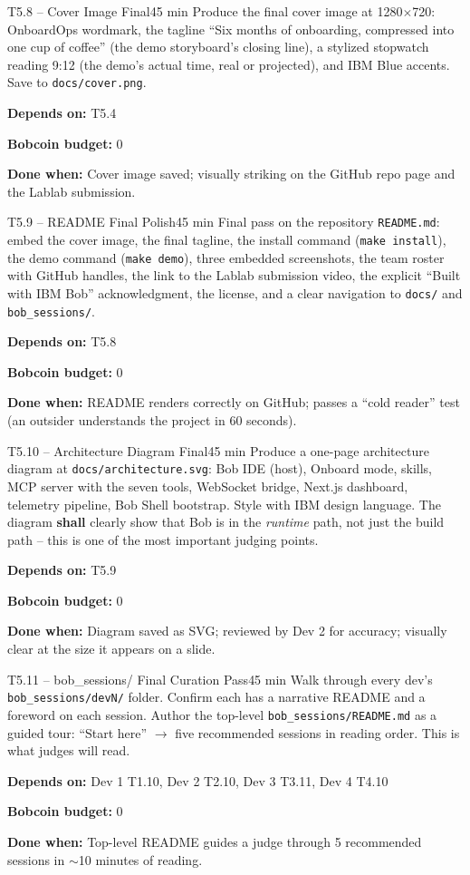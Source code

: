 \documentclass[11pt,letterpaper]{article}
\newcommand{\acceptance}[1]{\par\smallskip\textcolor{ibmgreen}{\textbf{Done when:}} #1}
\newcommand{\depends}[1]{\par\smallskip\textcolor{ibmorange}{\textbf{Depends on:}} #1}
\newcommand{\bobcost}[1]{\par\smallskip\textcolor{ibmaccent}{\textbf{Bobcoin budget:}} #1}
\newcommand{\shall}{\textbf{shall}}
\begin{document}
\begin{task}{T5.8 -- Cover Image Final}{45 min}
Produce the final cover image at 1280$\times$720: OnboardOps wordmark, the tagline ``Six months of onboarding, compressed into one cup of coffee'' (the demo storyboard's closing line), a stylized stopwatch reading 9:12 (the demo's actual time, real or projected), and IBM Blue accents. Save to \texttt{docs/cover.png}.
\depends{T5.4}
\bobcost{0}
\acceptance{Cover image saved; visually striking on the GitHub repo page and the Lablab submission.}
\end{task}

\begin{task}{T5.9 -- README Final Polish}{45 min}
Final pass on the repository \texttt{README.md}: embed the cover image, the final tagline, the install command (\texttt{make install}), the demo command (\texttt{make demo}), three embedded screenshots, the team roster with GitHub handles, the link to the Lablab submission video, the explicit ``Built with IBM Bob'' acknowledgment, the license, and a clear navigation to \texttt{docs/} and \texttt{bob\_sessions/}.
\depends{T5.8}
\bobcost{0}
\acceptance{README renders correctly on GitHub; passes a ``cold reader'' test (an outsider understands the project in 60 seconds).}
\end{task}

\begin{task}{T5.10 -- Architecture Diagram Final}{45 min}
Produce a one-page architecture diagram at \texttt{docs/architecture.svg}: Bob IDE (host), Onboard mode, skills, MCP server with the seven tools, WebSocket bridge, Next.js dashboard, telemetry pipeline, Bob Shell bootstrap. Style with IBM design language. The diagram \shall{} clearly show that Bob is in the \textit{runtime} path, not just the build path -- this is one of the most important judging points.
\depends{T5.9}
\bobcost{0}
\acceptance{Diagram saved as SVG; reviewed by Dev 2 for accuracy; visually clear at the size it appears on a slide.}
\end{task}

\begin{task}{T5.11 -- bob\_sessions/ Final Curation Pass}{45 min}
Walk through every dev's \texttt{bob\_sessions/devN/} folder. Confirm each has a narrative README and a foreword on each session. Author the top-level \texttt{bob\_sessions/README.md} as a guided tour: ``Start here'' $\rightarrow$ five recommended sessions in reading order. This is what judges will read.
\depends{Dev 1 T1.10, Dev 2 T2.10, Dev 3 T3.11, Dev 4 T4.10}
\bobcost{0}
\acceptance{Top-level README guides a judge through 5 recommended sessions in ${\sim}$10 minutes of reading.}
\end{task}
\end{document}
